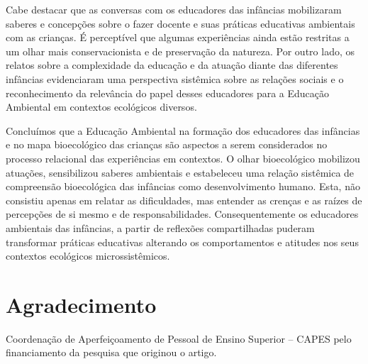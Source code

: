 \documentclass{textolivre}
\begin{document}
Cabe destacar que as conversas com os educadores das infâncias mobilizaram saberes e concepções sobre o fazer docente e suas práticas educativas ambientais com as crianças. É perceptível que algumas experiências ainda estão restritas a um olhar mais conservacionista e de preservação da natureza. Por outro lado, os relatos sobre a complexidade da educação e da atuação diante das diferentes infâncias evidenciaram uma perspectiva sistêmica sobre as relações sociais e o reconhecimento da relevância do papel desses educadores para a Educação Ambiental em contextos ecológicos diversos.

Concluímos que a Educação Ambiental na formação dos educadores das infâncias e no mapa bioecológico das crianças são aspectos a serem considerados no processo relacional das experiências em contextos. O olhar bioecológico mobilizou atuações, sensibilizou saberes ambientais e estabeleceu uma relação sistêmica de compreensão bioecológica das infâncias como desenvolvimento humano. Esta, não consistiu apenas em relatar as dificuldades, mas entender as crenças e as raízes de percepções de si mesmo e de responsabilidades. Consequentemente os educadores ambientais das infâncias, a partir de reflexões compartilhadas puderam transformar práticas educativas alterando os comportamentos e atitudes nos seus contextos ecológicos microssistêmicos. 


\section*{Agradecimento}
Coordenação de Aperfeiçoamento de Pessoal de Ensino Superior – CAPES pelo financiamento da pesquisa que originou o artigo.



\printbibliography
\end{document}
